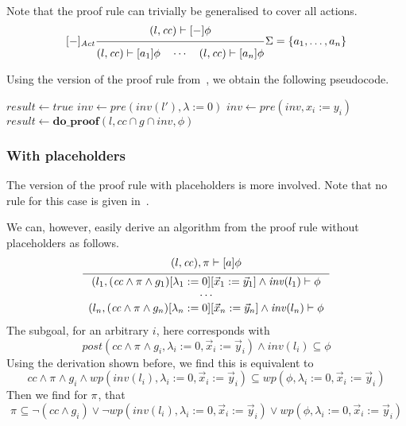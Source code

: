 \documentclass{article}
\newcommand{\proofrule}[3][]{#1 \frac{\raisebox{.7ex}{\normalsize{$#2$}}}
  {\raisebox{-1.0ex}{\normalsize{$#3$}}}}
\newcommand{\placeholder}[1][]{\pi_{#1}}
\newcommand{\loc}{l}
\newcommand{\region}{\mathit{cc}}
\newcommand{\inv}{\mathit{inv}}
\newcommand{\post}{\mathit{post}}
\newcommand{\wpre}{\mathit{wp}}
\newcommand{\var}[1]{\ensuremath{\mathit{#1}}}
\newcommand{\method}[1]{\ensuremath{\mathbf{#1}}}
\begin{document}
Note that the proof rule can trivially be generalised to cover all actions.
\[
\proofrule[{[-]_{\mathit{Act}}}]
{(\loc, \region) \vdash [-]\phi}
{(\loc, \region) \vdash [a_1]\phi
\quad \cdots \quad
(\loc, \region) \vdash [a_n]\phi}
\Sigma = \{ a_1, \ldots, a_n \}
\]

Using the version of the proof rule from~\cite{FC:14report}, we obtain the following pseudocode.
\begin{algorithm}[H]
  \caption{$\method{do\_proof\_allact}(\loc, \region, [-]\phi$}
  \begin{algorithmic}
  \STATE $\var{result} \gets \mathit{true}$
  \FOR{$(\loc, a, g, \lambda, \loc') \in E$}
    \IF{$\region \cap g \neq \emptyset$}
      \IF{$\inv(\loc') \neq \emptyset$}
        \STATE $\var{inv} \gets \mathit{pre}(\inv(\loc'), \lambda := 0)$
          \STATE $\var{inv} \gets \mathit{pre}(\var{inv}, x_i := y_i)$
        \ENDFOR
        \IF{$\region \cap g \cap \var{inv} \neq \emptyset$}
          \STATE $\var{result} \gets \method{do\_proof}(\loc, \region \cap g \cap \var{inv}, \phi)$
        \ENDIF
      \ENDIF
    \ENDIF
  \ENDFOR
  \end{algorithmic}
  \end{algorithm}

\subsubsection{With placeholders}
The version of the proof rule with placeholders is more involved. Note that no rule for this case is given in~\cite{FC:14report}.

We can, however, easily derive an algorithm from the proof rule without placeholders as follows.
\[
\proofrule
{(\loc, \region), \placeholder \vdash [a] \phi}
{
\begin{array}{c}
(\loc_1, (\region \land \placeholder \land g_1)[\lambda_1 := 0][\vec{x}_1 := \vec{y}_1] \land \inv(\loc_1) \vdash \phi\\
\cdots\\
(\loc_n, (\region \land \placeholder \land g_n)[\lambda_n := 0][\vec{x}_n := \vec{y}_n] \land \inv(\loc_n) \vdash \phi
\end{array}
}
\]
The subgoal, for an arbitrary $i$, here corresponds with
\[
  \post(\region \land \placeholder \land g_i, \lambda_i := 0, \vec{x}_i := \vec{y}_i) \land \inv(\loc_i) \subseteq \phi
  \]
Using the derivation shown before, we find this is equivalent to 
\[
  \region \land \placeholder \land g_i \land \wpre(\inv(\loc_i), \lambda_i := 0, \vec{x}_i := \vec{y}_i) \subseteq \wpre(\phi,\lambda_i := 0, \vec{x}_i := \vec{y}_i)
\]
Then we find for $\placeholder$, that
\[
  \placeholder \subseteq \lnot(\region \land g_i) \lor \lnot \wpre(\inv(\loc_i), \lambda_i := 0, \vec{x}_i := \vec{y}_i) \lor \wpre(\phi,\lambda_i := 0, \vec{x}_i := \vec{y}_i)
\]
\end{document}
